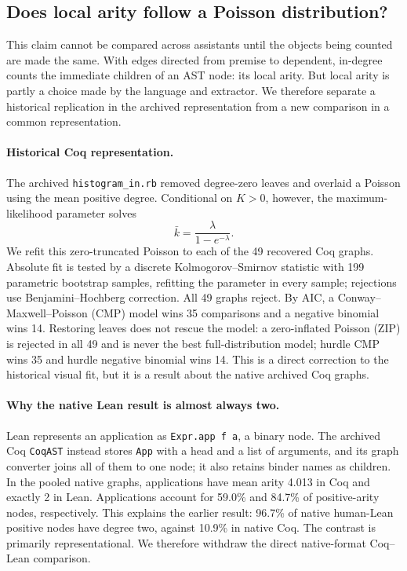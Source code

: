 \documentclass[11pt]{article}
\newcommand{\code}[1]{\texttt{#1}}
\begin{document}
\subsection{Does local arity follow a Poisson distribution?}
\label{app:poisson}

This claim cannot be compared across assistants until the objects being counted are made the same.
With edges directed from premise to dependent, in-degree counts the immediate children of an AST
node: its local arity.  But local arity is partly a choice made by the language and extractor.  We
therefore separate a historical replication in the archived representation from a new comparison
in a common representation.

\paragraph{Historical Coq representation.}
The archived \code{histogram\_in.rb} removed degree-zero leaves and overlaid a Poisson using the
mean positive degree.  Conditional on $K>0$, however, the maximum-likelihood parameter solves
\[
  \bar k=\frac{\lambda}{1-e^{-\lambda}}.
\]
We refit this zero-truncated Poisson to each of the 49 recovered Coq graphs.  Absolute fit is tested
by a discrete Kolmogorov--Smirnov statistic with 199 parametric bootstrap samples, refitting the
parameter in every sample; rejections use Benjamini--Hochberg correction.  All 49 graphs reject.
By AIC, a Conway--Maxwell--Poisson (CMP) model \citep{shmueli2005} wins 35 comparisons and a
negative binomial wins 14.  Restoring leaves does not rescue the model: a zero-inflated Poisson
(ZIP) is rejected in all 49 and is never the best full-distribution model; hurdle CMP wins 35 and
hurdle negative binomial wins 14.  This is a direct correction to the historical visual fit, but it
is a result about the native archived Coq graphs.

\paragraph{Why the native Lean result is almost always two.}
Lean represents an application as \code{Expr.app f a}, a binary node.  The archived Coq
\code{CoqAST} instead stores \code{App} with a head and a list of arguments, and its graph converter
joins all of them to one node; it also retains binder names as children.  In the pooled native
graphs, applications have mean arity 4.013 in Coq and exactly 2 in Lean.  Applications account for
59.0\% and 84.7\% of positive-arity nodes, respectively.  This explains the earlier result: 96.7\%
of native human-Lean positive nodes have degree two, against 10.9\% in native Coq.  The contrast is
primarily representational.  We therefore withdraw the direct native-format Coq--Lean comparison.
\end{document}
